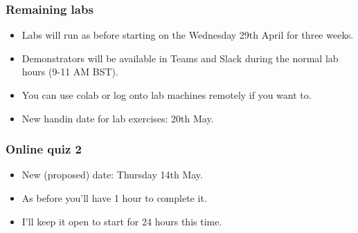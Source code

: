 \documentclass[\beamerclass]{beamer}
\begin{document}
\begin{frame}[plain]
\end{frame}


\begin{frame}
\frametitle{Remaining labs}

\begin{itemize}
	\item<+-> Labs will run as before starting on the Wednesday 29th April for three weeks.
	\item<+-> Demonstrators will be available in Teams and Slack during the normal lab hours (9-11 AM BST).
	\item<+-> You can use colab or log onto lab machines remotely if you want to.
	\item<+-> New handin date for lab exercises: 20th May.
\end{itemize}
\end{frame}

\begin{frame}
\frametitle{Online quiz 2}
\begin{itemize}
	\item New (proposed) date: Thursday 14th May.
	\item As before you'll have 1 hour to complete it.
	\item I'll keep it open to start for 24 hours this time.
\end{itemize}
\end{frame}
\end{document}
